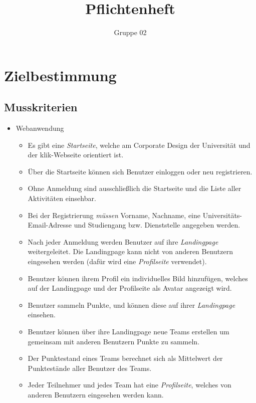 \documentclass[10pt,a4paper]{article}
\author{Gruppe 02}
\title{Pflichtenheft}
\begin{document}
\maketitle
\tableofcontents
\section{Zielbestimmung}
	\subsection{Musskriterien}
	\begin{itemize}
		\item Webanwendung
		\begin{itemize}
			\item Es gibt eine \emph{Startseite}, welche am Corporate Design der Universität und der klik-Webseite orientiert ist.
                        \item Über die Startseite können sich Benutzer einloggen oder neu registrieren.
			\item Ohne Anmeldung sind ausschließlich die Startseite und die Liste aller Aktivitäten einsehbar.
			\item Bei der Registrierung \emph{müssen} Vorname, Nachname, eine Universitäts-Email-Adresse und Studiengang bzw. Dienststelle angegeben werden.
                        \item Nach jeder Anmeldung werden Benutzer auf ihre \emph{Landingpage} weitergeleitet. Die Landingpage kann nicht von anderen Benutzern  eingesehen werden (dafür wird eine \emph{Profilseite} verwendet).
                        \item Benutzer können ihrem Profil ein individuelles Bild hinzufügen, welches auf der Landingpage und der Profilseite als Avatar angezeigt wird.
                        \item Benutzer sammeln Punkte, und können diese auf ihrer \emph{Landingpage} einsehen. 
                        \item Benutzer können über ihre Landingpage neue Teams erstellen um gemeinsam mit anderen Benutzern Punkte zu sammeln.
                        \item Der Punktestand eines Teams berechnet sich als Mittelwert der Punktestände aller Benutzer des Teams.
                        \item Jeder Teilnehmer und jedes Team hat eine \emph{Profilseite}, welches von anderen Benutzern eingesehen werden kann.

\end{itemize}
\end{itemize}
\end{document}
